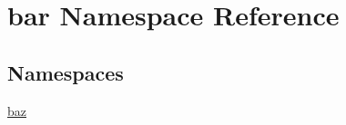 \hypertarget{namespacebar}{}\section{bar Namespace Reference}
\label{namespacebar}
\subsection*{Namespaces}
\begin{DoxyCompactItemize}
\item 
 \mbox{\hyperlink{namespacebar_1_1baz}{baz}}
\end{DoxyCompactItemize}
